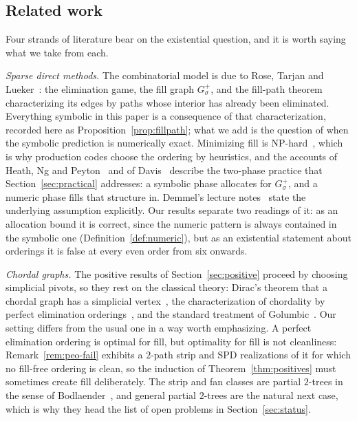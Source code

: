\documentclass[11pt]{article}
\theoremstyle{plain}
\theoremstyle{definition}
\theoremstyle{remark}
\begin{document}
\begin{humanblock}
\subsection{Related work}

Four strands of literature bear on the existential question, and it is worth saying what we take from
each.

\emph{Sparse direct methods.} The combinatorial model is due to Rose, Tarjan and Lueker~\cite{Rose}:
the elimination game, the fill graph $G^+_\sigma$, and the fill-path theorem characterizing its edges
by paths whose interior has already been eliminated. Everything symbolic in this paper is a
consequence of that characterization, recorded here as Proposition~\ref{prop:fillpath}; what we add is
the question of when the symbolic prediction is numerically exact. Minimizing fill is
NP-hard~\cite{Yannakakis}, which is why production codes choose the ordering by heuristics, and the
accounts of Heath, Ng and Peyton~\cite{Heath} and of Davis~\cite{Davis} describe the two-phase
practice that Section~\ref{sec:practical} addresses: a symbolic phase allocates for $G^+_\sigma$, and
a numeric phase fills that structure in. Demmel's lecture notes~\cite{Demmel} state the underlying
assumption explicitly. Our results separate two readings of it: as an allocation bound it is correct,
since the numeric pattern is always contained in the symbolic one (Definition~\ref{def:numeric}), but
as an existential statement about orderings it is false at every even order from six onwards.

\emph{Chordal graphs.} The positive results of Section~\ref{sec:positive} proceed by choosing
simplicial pivots, so they rest on the classical theory: Dirac's theorem that a chordal graph has a
simplicial vertex~\cite{Dirac}, the characterization of chordality by perfect elimination
orderings~\cite{Fulkerson}, and the standard treatment of Golumbic~\cite{Golumbic}. Our setting
differs from the usual one in a way worth emphasizing. A perfect elimination ordering is optimal for
fill, but optimality for fill is not cleanliness: Remark~\ref{rem:peo-fail} exhibits a $2$-path strip
and SPD realizations of it for which no fill-free ordering is clean, so the induction of
Theorem~\ref{thm:positives} must sometimes create fill deliberately. The strip and fan classes are
partial $2$-trees in the sense of Bodlaender~\cite{Bodlaender}, and general partial $2$-trees are the
natural next case, which is why they head the list of open problems in Section~\ref{sec:status}.


\end{humanblock}
\end{document}
